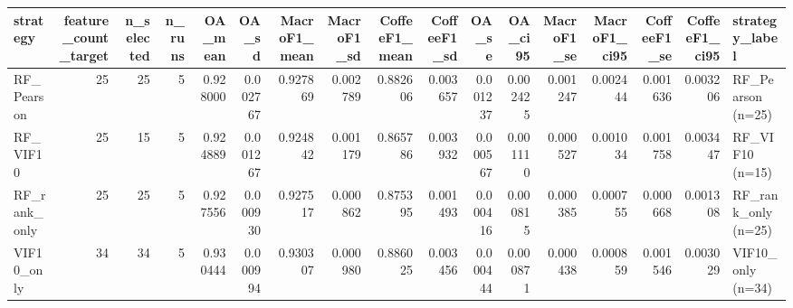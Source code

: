 \begin{tabular}{lrrrrrrrrrrrrrrrl}
\toprule
strategy & feature_count_target & n_selected & n_runs & OA_mean & OA_sd & MacroF1_mean & MacroF1_sd & CoffeeF1_mean & CoffeeF1_sd & OA_se & OA_ci95 & MacroF1_se & MacroF1_ci95 & CoffeeF1_se & CoffeeF1_ci95 & strategy_label \\
\midrule
RF_Pearson & 25 & 25 & 5 & 0.928000 & 0.002767 & 0.927869 & 0.002789 & 0.882606 & 0.003657 & 0.001237 & 0.002425 & 0.001247 & 0.002444 & 0.001636 & 0.003206 & RF_Pearson
(n=25) \\
RF_VIF10 & 25 & 15 & 5 & 0.924889 & 0.001267 & 0.924842 & 0.001179 & 0.865786 & 0.003932 & 0.000567 & 0.001110 & 0.000527 & 0.001034 & 0.001758 & 0.003447 & RF_VIF10
(n=15) \\
RF_rank_only & 25 & 25 & 5 & 0.927556 & 0.000930 & 0.927517 & 0.000862 & 0.875395 & 0.001493 & 0.000416 & 0.000815 & 0.000385 & 0.000755 & 0.000668 & 0.001308 & RF_rank_only
(n=25) \\
VIF10_only & 34 & 34 & 5 & 0.930444 & 0.000994 & 0.930307 & 0.000980 & 0.886025 & 0.003456 & 0.000444 & 0.000871 & 0.000438 & 0.000859 & 0.001546 & 0.003029 & VIF10_only
(n=34) \\
\bottomrule
\end{tabular}
